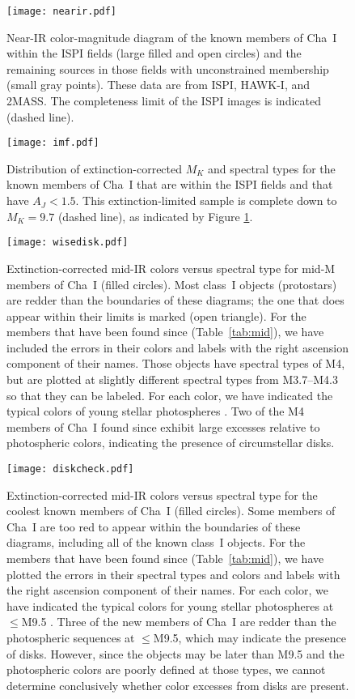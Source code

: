 \documentclass{emulateapj}
\begin{document}
\begin{figure}[h]
\centering
\texttt{[image: nearir.pdf]}
\caption{
Near-IR color-magnitude diagram of the known members of Cha~I 
within the ISPI fields (large filled and open circles) and the remaining
sources in those fields with unconstrained membership (small gray points).
These data are from ISPI, HAWK-I, and 2MASS. 
The completeness limit of the ISPI images is indicated (dashed line). 
}
\label{fig:near}
\end{figure}

\begin{figure}[h]
\centering
\texttt{[image: imf.pdf]}
\caption{
Distribution of extinction-corrected $M_K$ and spectral types for the known 
members of Cha~I that are within the ISPI fields and that have $A_J<1.5$.
This extinction-limited sample is complete down to $M_K=9.7$ (dashed line), 
as indicated by Figure \ref{fig:near}.
}
\label{fig:imf}
\end{figure}

\begin{figure}[h]
\centering
\texttt{[image: wisedisk.pdf]}
\caption{
Extinction-corrected mid-IR colors versus spectral type for mid-M members of
Cha~I (filled circles). Most class~I objects (protostars)
are redder than the boundaries of these diagrams; the one that does
appear within their limits is marked (open triangle).
For the members that have been found since
\cite{luhm08} (Table~\ref{tab:mid}), we have included the errors in their
colors and labels with the right ascension component of their names.
Those objects have spectral types of M4, but are plotted at slightly different
spectral types from M3.7--M4.3 so that they can be labeled.
For each color, we have indicated the typical colors of young
stellar photospheres \citep[lines,][Section~\ref{sec:disk}]{luh10}.
Two of the M4 members of Cha~I found since \cite{luhm08} exhibit large
excesses relative to photospheric colors, indicating the presence
of circumstellar disks.
}
\label{fig:disk2}
\end{figure}

\begin{figure}[h]
\centering
\texttt{[image: diskcheck.pdf]}
\caption{
Extinction-corrected mid-IR colors versus spectral type for the coolest known 
members of Cha~I (filled circles).  Some members of Cha~I are too
red to appear within the boundaries of these diagrams, including all of the
known class~I objects. For the members that have been found since
\cite{luhm08} (Table~\ref{tab:mid}), we have plotted the errors in their
spectral types and colors and labels with the right ascension component
of their names.  For each color, we have indicated the typical 
colors for young stellar photospheres at $\leq$M9.5 \citep[lines,][]{luh10}.
Three of the new members of Cha~I are redder than the photospheric sequences
at $\leq$M9.5, which may indicate the presence of disks. However, since the
objects may be later than M9.5 and the photospheric colors are poorly defined at
those types, we cannot determine conclusively whether color excesses from
disks are present.
}
\label{fig:disk}
\end{figure}
\end{document}
